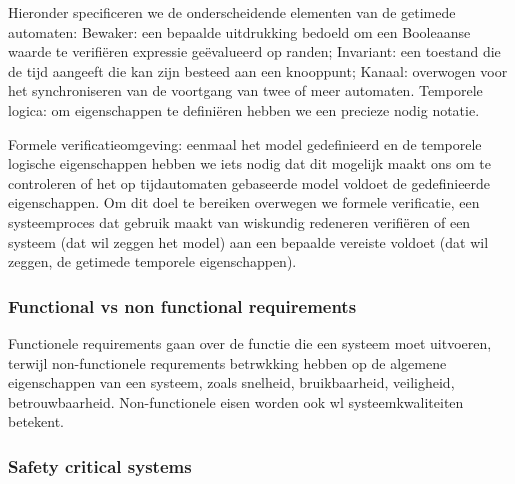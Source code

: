 \documentclass{article}
\begin{document}
	Hieronder specificeren we de onderscheidende elementen van de getimede automaten:
	Bewaker: een bepaalde uitdrukking bedoeld om een Booleaanse waarde te verifiëren
	expressie geëvalueerd op randen;
	Invariant: een toestand die de tijd aangeeft die kan zijn
	besteed aan een knooppunt;
	Kanaal: overwogen voor het synchroniseren van de voortgang van
	twee of meer automaten.
	Temporele logica: om eigenschappen te definiëren hebben we een precieze nodig
	notatie.
	
	
	Formele verificatieomgeving: eenmaal het model gedefinieerd
	en de temporele logische eigenschappen hebben we iets nodig dat dit mogelijk maakt
	ons om te controleren of het op tijdautomaten gebaseerde model voldoet
	de gedefinieerde eigenschappen. Om dit doel te bereiken overwegen we formele verificatie,
	een systeemproces dat gebruik maakt van wiskundig redeneren
	verifiëren of een systeem (dat wil zeggen het model) aan een bepaalde vereiste voldoet
	(dat wil zeggen, de getimede temporele eigenschappen).
	
 
	

	
	\subsubsection{Functional vs non functional requirements}
	Functionele requirements gaan over de functie die een systeem moet uitvoeren, terwijl non-functionele requrements betrwkking  hebben op de algemene eigenschappen van een systeem, zoals snelheid, bruikbaarheid, veiligheid, betrouwbaarheid. Non-functionele eisen worden ook wl systeemkwaliteiten betekent.
	\subsubsection{Safety critical systems}
	
\end{document}
